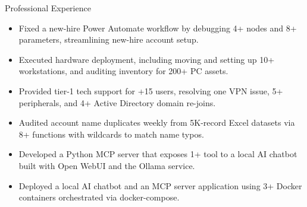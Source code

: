 \begin{experienceSection}{Professional Experience}

    \experienceItem[
        company={NYC Department of Design and Construction},
        location={Long Island City, NY},
        position={Service Desk Intern},
        duration={July 2026 -- August 2026}
    ]
    \begin{itemize}
        \itemsep -6pt {}
        \item Fixed a new-hire Power Automate workflow by debugging 4+ nodes and 8+ parameters, streamlining new-hire account setup.
        \item Executed hardware deployment, including moving and setting up 10+ workstations, and auditing inventory for 200+ PC assets.
        \item Provided tier-1 tech support for +15 users, resolving one VPN issue, 5+ peripherals, and 4+ Active Directory domain re-joins.
    \end{itemize}

    \experienceItem[
        company={NYC Department of Social Services},
        location={New York, NY},
        position={Cybersecurity Intern},
        duration={March 2026 -- April 2026}
    ]
    \begin{itemize}
        \itemsep -6pt {}
        \item Audited account name duplicates weekly from 5K-record Excel datasets via 8+ functions with wildcards to match name typos.
        \item Developed a Python MCP server that exposes 1+ tool to a local AI chatbot built with Open WebUI and the Ollama service.
        \item Deployed a local AI chatbot and an MCP server application using 3+ Docker containers orchestrated via docker-compose. 
    \end{itemize}
\end{experienceSection}
